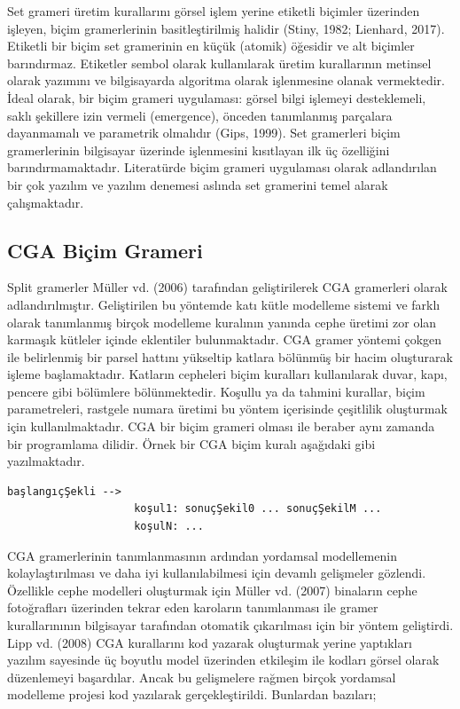 \documentclass[12pt,turkish,a4paperpaper,]{report}
\begin{document}
Set grameri üretim kurallarını görsel işlem yerine etiketli biçimler
üzerinden işleyen, biçim gramerlerinin basitleştirilmiş halidir (Stiny,
1982; Lienhard, 2017). Etiketli bir biçim set gramerinin en küçük
(atomik) öğesidir ve alt biçimler barındırmaz. Etiketler sembol olarak
kullanılarak üretim kurallarının metinsel olarak yazımını ve
bilgisayarda algoritma olarak işlenmesine olanak vermektedir. İdeal
olarak, bir biçim grameri uygulaması: görsel bilgi işlemeyi
desteklemeli, saklı şekillere izin vermeli (emergence), önceden
tanımlanmış parçalara dayanmamalı ve parametrik olmalıdır (Gips, 1999).
Set gramerleri biçim gramerlerinin bilgisayar üzerinde işlenmesini
kısıtlayan ilk üç özelliğini barındırmamaktadır. Literatürde biçim
grameri uygulaması olarak adlandırılan bir çok yazılım ve yazılım
denemesi aslında set gramerini temel alarak çalışmaktadır.

\hypertarget{cga-biuxe7im-grameri}{%
\subsection{CGA Biçim Grameri}\label{cga-biuxe7im-grameri}}

Split gramerler Müller vd. (2006) tarafından geliştirilerek CGA
gramerleri olarak adlandırılmıştır. Geliştirilen bu yöntemde katı kütle
modelleme sistemi ve farklı olarak tanımlanmış birçok modelleme
kuralının yanında cephe üretimi zor olan karmaşık kütleler içinde
eklentiler bulunmaktadır. CGA gramer yöntemi çokgen ile belirlenmiş bir
parsel hattını yükseltip katlara bölünmüş bir hacim oluşturarak işleme
başlamaktadır. Katların cepheleri biçim kuralları kullanılarak duvar,
kapı, pencere gibi bölümlere bölünmektedir. Koşullu ya da tahmini
kurallar, biçim parametreleri, rastgele numara üretimi bu yöntem
içerisinde çeşitlilik oluşturmak için kullanılmaktadır. CGA bir biçim
grameri olması ile beraber aynı zamanda bir programlama dilidir. Örnek
bir CGA biçim kuralı aşağıdaki gibi yazılmaktadır.

\begin{verbatim}
başlangıçŞekli -->
                    koşul1: sonuçŞekil0 ... sonuçŞekilM ...
                    koşulN: ...
\end{verbatim}

CGA gramerlerinin tanımlanmasının ardından yordamsal modellemenin
kolaylaştırılması ve daha iyi kullanılabilmesi için devamlı gelişmeler
gözlendi. Özellikle cephe modelleri oluşturmak için Müller vd. (2007)
binaların cephe fotoğrafları üzerinden tekrar eden karoların
tanımlanması ile gramer kurallarınının bilgisayar tarafından otomatik
çıkarılması için bir yöntem geliştirdi. Lipp vd. (2008) CGA kurallarını
kod yazarak oluşturmak yerine yaptıkları yazılım sayesinde üç boyutlu
model üzerinden etkileşim ile kodları görsel olarak düzenlemeyi
başardılar. Ancak bu gelişmelere rağmen birçok yordamsal modelleme
projesi kod yazılarak gerçekleştirildi. Bunlardan bazıları;
\end{document}
